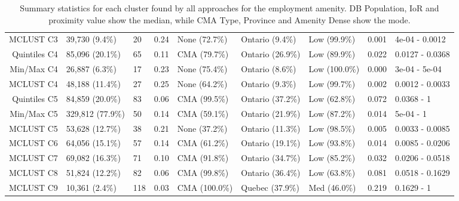 \documentclass[11pt, a4paper]{article}
\begin{document}
\begin{table}[H]
{\begin{tabular}{|r|llllllll|}
  MCLUST C3 & 39,730 (9.4\%) & 20 & 0.24 & None (72.7\%) & Ontario (9.4\%) & Low (99.9\%) & 0.001 & 4e-04 - 0.0012 \\ 
  Quintiles C4 & 85,096 (20.1\%) & 65 & 0.11 & CMA (79.7\%) & Ontario (26.9\%) & Low (89.9\%) & 0.022 & 0.0127 - 0.0368 \\ 
  Min/Max C4 & 26,887 (6.3\%) & 17 & 0.23 & None (75.4\%) & Ontario (8.6\%) & Low (100.0\%) & 0.000 & 3e-04 - 5e-04 \\ 
  MCLUST C4 & 48,188 (11.4\%) & 27 & 0.25 & None (64.2\%) & Ontario (9.3\%) & Low (99.7\%) & 0.002 & 0.0012 - 0.0033 \\ 
  Quintiles C5 & 84,859 (20.0\%) & 83 & 0.06 & CMA (99.5\%) & Ontario (37.2\%) & Low (62.8\%) & 0.072 & 0.0368 - 1 \\ 
  Min/Max C5 & 329,812 (77.9\%) & 50 & 0.14 & CMA (59.1\%) & Ontario (21.9\%) & Low (87.2\%) & 0.014 & 5e-04 - 1 \\ 
  MCLUST C5 & 53,628 (12.7\%) & 38 & 0.21 & None (37.2\%) & Ontario (11.3\%) & Low (98.5\%) & 0.005 & 0.0033 - 0.0085 \\ 
  MCLUST C6 & 64,056 (15.1\%) & 57 & 0.14 & CMA (61.2\%) & Ontario (19.1\%) & Low (93.8\%) & 0.014 & 0.0085 - 0.0206 \\ 
  MCLUST C7 & 69,082 (16.3\%) & 71 & 0.10 & CMA (91.8\%) & Ontario (34.7\%) & Low (85.2\%) & 0.032 & 0.0206 - 0.0518 \\ 
  MCLUST C8 & 51,824 (12.2\%) & 82 & 0.06 & CMA (99.8\%) & Ontario (36.4\%) & Low (63.8\%) & 0.081 & 0.0518 - 0.1629 \\ 
  MCLUST C9 & 10,361 (2.4\%) & 118 & 0.03 & CMA (100.0\%) & Quebec (37.9\%) & Med (46.0\%) & 0.219 & 0.1629 - 1 \\ 
   \hline
\end{tabular}
}
\caption[Employment cluster profiles]{Summary statistics for each cluster found by all approaches for the employment amenity. DB Population, IoR and proximity value show the median, while CMA Type, Province and Amenity Dense show the mode.}\label{employmentprofiles}
\end{table}
\end{document}
